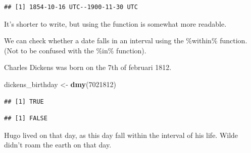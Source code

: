 \documentclass[]{tufte-book}
\newenvironment{Shaded}{}{}
\newcommand{\DecValTok}[1]{\textcolor[rgb]{0.25,0.63,0.44}{#1}}
\newcommand{\KeywordTok}[1]{\textcolor[rgb]{0.00,0.44,0.13}{\textbf{#1}}}
\newcommand{\NormalTok}[1]{#1}
\newcommand{\OperatorTok}[1]{\textcolor[rgb]{0.40,0.40,0.40}{#1}}
\newcommand{\StringTok}[1]{\textcolor[rgb]{0.25,0.44,0.63}{#1}}
\begin{document}
\begin{Shaded}
\end{Shaded}

\begin{verbatim}
## [1] 1854-10-16 UTC--1900-11-30 UTC
\end{verbatim}

It's shorter to write, but using the function is somewhat more readable.

We can check whether a date falls in an interval using the \%within\% function. (Not to be confused with the \%in\% function).

Charles Dickens was born on the 7th of februari 1812.

\begin{Shaded}
\begin{Highlighting}[]
\NormalTok{dickens_birthday <-}\StringTok{ }\KeywordTok{dmy}\NormalTok{(}\DecValTok{7021812}\NormalTok{)}
\end{Highlighting}
\end{Shaded}

\begin{Shaded}
\end{Shaded}

\begin{verbatim}
## [1] TRUE
\end{verbatim}

\begin{Shaded}
\end{Shaded}

\begin{verbatim}
## [1] FALSE
\end{verbatim}

Hugo lived on that day, as this day fall within the interval of his life. Wilde didn't roam the earth on that day.
\end{document}
